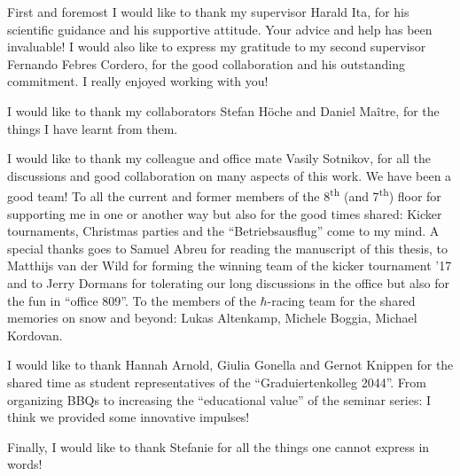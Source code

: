 \vspace{1cm}
First and foremost I would like to thank my supervisor Harald Ita, for his scientific guidance and his supportive attitude. Your advice and help has been invaluable! I would also like to express my gratitude to my second supervisor Fernando Febres Cordero, for the good collaboration and his outstanding commitment. I really enjoyed working with you! 

I would like to thank my collaborators Stefan H{\"o}che and Daniel Ma{\^i}tre, for the things I have learnt from them.

I would like to thank my colleague and office mate Vasily Sotnikov, for all the discussions and good collaboration on many aspects of this work. We have been a good team! To all the current and former members of the 8\textsuperscript{th} (and 7\textsuperscript{th}) floor for supporting me in one or another way but also for the good times shared: Kicker tournaments, Christmas parties and the ``Betriebsausflug'' come to my mind. A special thanks goes to Samuel Abreu for reading the manuscript of this thesis, to Matthijs van der Wild for forming the winning team of the kicker tournament '17 and to Jerry Dormans for tolerating our long discussions in the office but also for the fun in ``office 809''. To the members of the $\hbar$-racing team for the shared memories on snow and beyond: Lukas Altenkamp, Michele Boggia, Michael Kordovan.

I would like to thank Hannah Arnold, Giulia Gonella and Gernot Knippen for the shared time as student representatives of the ``Graduiertenkolleg 2044''. From organizing BBQs to increasing the ``educational value'' of the seminar series: I think we provided some innovative impulses!

Finally, I would like to thank Stefanie for all the things one cannot express in words!

